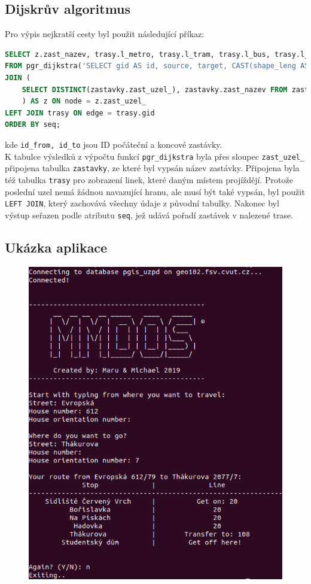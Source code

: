\documentclass[a4paper, 12pt]{article}
\begin{document}
\subsection{Dijskrův algoritmus}
Pro výpis nejkratší cesty byl použit následující příkaz:
\begin{lstlisting}[language=SQL]
SELECT z.zast_nazev, trasy.l_metro, trasy.l_tram, trasy.l_bus, trasy.l_lan, trasy.l_vlak, trasy.l_lod, node
FROM pgr_dijkstra('SELECT gid AS id, source, target, CAST(shape_leng AS REAL) AS cost FROM trasy', id_from, id_to)
JOIN (
	SELECT DISTINCT(zastavky.zast_uzel_), zastavky.zast_nazev FROM zastavky
	) AS z ON node = z.zast_uzel_
LEFT JOIN trasy ON edge = trasy.gid 
ORDER BY seq;
\end{lstlisting}
kde \texttt{id\_from, id\_to} jsou ID počáteční a koncové zastávky. \\
K tabulce výsledků z výpočtu funkcí \texttt{pgr\_dijkstra} byla přes sloupec \texttt{zast\_uzel\_} připojena tabulka \texttt{zastavky}, ze které byl vypsán název zastávky. Připojena byla též tabulka \texttt{trasy} pro zobrazení linek, které daným místem projíždějí. Protože poslední uzel nemá žádnou navazující hranu, ale musí být také vypsán, byl použit \texttt{LEFT JOIN}, který zachovává všechny údaje z původní tabulky. Nakonec byl výstup seřazen podle atributu \texttt{seq}, jež udává pořadí zastávek v nalezené trase.
\newpage
\subsection{Ukázka aplikace}

\begin{figure}[h!]
 \centering
 \includegraphics[scale=0.5]{ukazka.png}
\end{figure}
\end{document}
